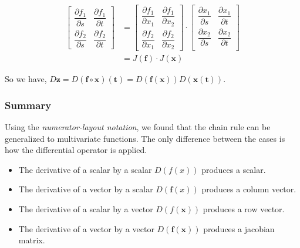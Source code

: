 \documentclass{article}
\begin{document}
\begin{align*}
\begin{bmatrix}
    \dfrac{\partial f_1}{\partial s} &
    \dfrac{\partial f_1}{\partial t} \\
    \dfrac{\partial f_2}{\partial s} &
    \dfrac{\partial f_2}{\partial t}
\end{bmatrix}
&=
\begin{bmatrix}
    \dfrac{\partial f_1}{\partial x_1} &
    \dfrac{\partial f_1}{\partial x_2} \\
    \dfrac{\partial f_2}{\partial x_1} &
    \dfrac{\partial f_2}{\partial x_2}
\end{bmatrix} \cdot
\begin{bmatrix}
    \dfrac{\partial x_1}{\partial s} & 
    \dfrac{\partial x_1}{\partial t} \\
    \dfrac{\partial x_2}{\partial s} & 
    \dfrac{\partial x_2}{\partial t} \\
\end{bmatrix} \\
&= J(\mathbf{f}) \cdot J(\mathbf{x})
\end{align*}

So we have, $D\mathbf{z} = D(\mathbf{f} \circ \mathbf{x})(\mathbf{t}) =
D(\mathbf{f}(\mathbf{x}))D(\mathbf{x}(\mathbf{t}))$.

\subsubsection{Summary}
Using the \textit{numerator-layout notation}, we found that the chain rule can
be generalized to multivariate functions. The only difference between the cases
is how the differential operator is applied.

\begin{itemize}
    \item The derivative of a scalar by a scalar $D(f(x))$ produces a scalar.
    \item The derivative of a vector by a scalar $D(\mathbf{f}(x))$ produces a column vector.
    \item The derivative of a scalar by a vector $D(f(\mathbf{x}))$ produces a row vector.
    \item The derivative of a vector by a vector $D(\mathbf{f}(\mathbf{x}))$ produces a
        jacobian matrix.
\end{itemize}
\end{document}
